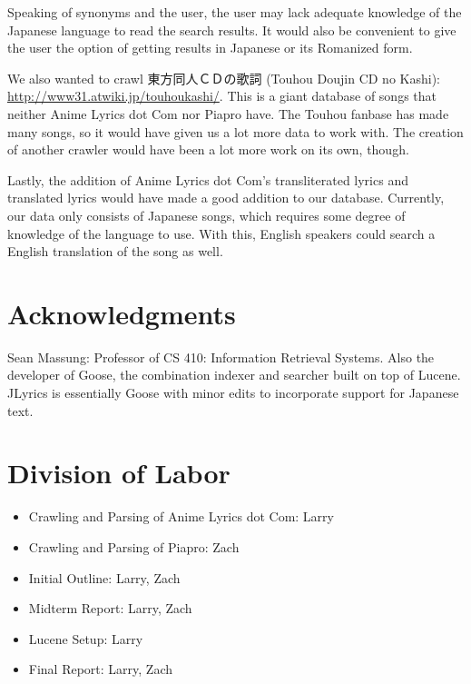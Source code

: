 \documentclass{acm} %
\begin{document}
\begin{CJK}{UTF8}{zhsong}
Speaking of synonyms and the user, the user may lack adequate knowledge of the Japanese language to read the search results. It would also be convenient to give the user the option of getting results in Japanese or its Romanized form.

We also wanted to crawl 東方同人ＣＤの歌詞 (Touhou Doujin CD no Kashi): \url{http://www31.atwiki.jp/touhoukashi/}. This is a giant database of songs that neither Anime Lyrics dot Com nor Piapro have. The Touhou fanbase has made many songs, so it would have given us a lot more data to work with. The creation of another crawler would have been a lot more work on its own, though.

Lastly, the addition of Anime Lyrics dot Com's transliterated lyrics and translated lyrics would have made a good addition to our database. Currently, our data only consists of Japanese songs, which requires some degree of knowledge of the language to use. With this, English speakers could search a English translation of the song as well.

\section*{Acknowledgments}

Sean Massung: Professor of CS 410: Information Retrieval Systems. Also the developer of Goose, the combination indexer and searcher built on top of Lucene. JLyrics is essentially Goose with minor edits to incorporate support for Japanese text.

\appendix

\section{Division of Labor}

\begin{itemize}
\item Crawling and Parsing of Anime Lyrics dot Com: Larry
\item Crawling and Parsing of Piapro: Zach
\item Initial Outline: Larry, Zach
\item Midterm Report: Larry, Zach
\item Lucene Setup: Larry
\item Final Report: Larry, Zach
\end{itemize}



\end{CJK}
\end{document}
